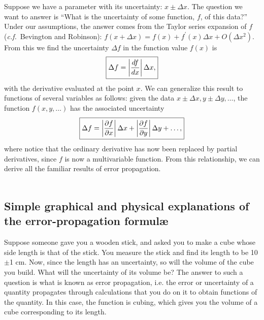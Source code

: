 Suppose we have a parameter with its uncertainty: $x \pm \Delta x$. The 
question we want to answer is ``What is the uncertainty of some function, $f$,
of this data?'' Under our assumptions, the answer comes from the Taylor 
series expansion of $f$ ({\it c.f.}~Bevington and Robinson): 
$f(x + \Delta x) = f(x) + f^\prime(x) \Delta x + O(\Delta x ^2)$. From this we 
find the uncertainty $\Delta f$ in the function value $f(x)$ is
\begin{equation}
\fbox{$ \displaystyle 
\Delta f = \left| \frac{df}{dx} \right| \Delta x, $} \label{equ:diff:single-uncertainty}
\end{equation}
with the derivative evaluated at the point $x$. We can generalize this result 
to functions of several variables as follows: given the data $x \pm \Delta x, 
y \pm \Delta y, \ldots$,  the function $f(x,y,\ldots)$ has the associated 
uncertainty
\begin{equation}
 \fbox{$ \displaystyle \Delta f = \left| \frac{\partial f}{\partial x} \right| \Delta x +
           \left| \frac{\partial f}{\partial y} \right| \Delta y + \ldots, $}
\label{equ:diff:uncertainty}
\end{equation}
where notice that the ordinary derivative has now been replaced by partial derivatives, since $f$ is now a multivariable function. From  this relationship, we can derive all the familiar results of error 
propagation.\\
\\
\subsection{Simple graphical and physical explanations of the error-propagation formul\ae}
Suppose someone gave you a wooden stick, and asked you to make a cube
whose side length is that of the stick. You measure the stick and
find its length to be 10$\pm$1 cm. Now, since the length has an uncertainty,
so will the volume of the cube you build. What will the uncertainty
of its volume be? The answer to such a question is what is known as
error propagation, i.e. the error or uncertainty of a quantity propagates
through calculations that you do on it to obtain functions of the
quantity. In this case, the function is cubing, which gives you the
volume of a cube corresponding to its length.

